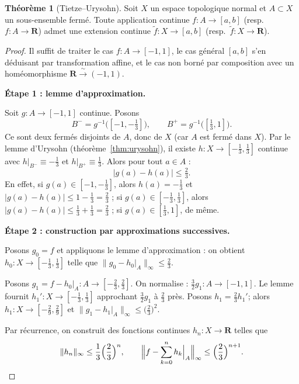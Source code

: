 \documentclass[12pt,a4paper,openany]{book}
\theoremstyle{definition}
\theoremstyle{cours}
\newtheorem{theoreme}{Théorème}[chapter]
\theoremstyle{coursnormal}
\begin{document}
\begin{theoreme}[Tietze--Urysohn]
\label{thm:tietze}
Soit $X$ un espace topologique normal et $A\subset X$ un sous-ensemble
fermé. Toute application continue $f\colon A\to [a,b]$
(resp.\ $f\colon A\to\mathbf{R}$) admet une extension continue
$\tilde{f}\colon X\to [a,b]$ (resp.\ $\tilde{f}\colon X\to\mathbf{R}$).
\end{theoreme}

\begin{proof}
Il suffit de traiter le cas $f\colon A\to[-1,1]$, le cas général
$[a,b]$ s'en déduisant par transformation affine, et le cas non borné
par composition avec un homéomorphisme $\mathbf{R}\xrightarrow{\;\sim\;}(-1,1)$.

\medskip\noindent
\textbf{Étape 1 : lemme d'approximation.}

Soit $g\colon A\to [-1,1]$ continue. Posons
\[
  B^{-}=g^{-1}\!\bigl([-1,-\tfrac{1}{3}]\bigr),\qquad
  B^{+}=g^{-1}\!\bigl([\tfrac{1}{3},1]\bigr).
\]
Ce sont deux fermés disjoints de $A$, donc de $X$ (car $A$ est fermé
dans $X$). Par le lemme d'Urysohn (théorème~\ref{thm:urysohn}),
il existe $h\colon X\to[-\frac{1}{3},\frac{1}{3}]$ continue avec
$h|_{B^{-}}\equiv -\frac{1}{3}$ et $h|_{B^{+}}\equiv \frac{1}{3}$.
Alors pour tout $a\in A$ :
\[
|g(a)-h(a)|\le \tfrac{2}{3}.
\]
En effet, si $g(a)\in[-1,-\frac{1}{3}]$, alors $h(a)=-\frac{1}{3}$
et $|g(a)-h(a)|\le 1-\frac{1}{3}=\frac{2}{3}$ ;
si $g(a)\in[-\frac{1}{3},\frac{1}{3}]$, alors
$|g(a)-h(a)|\le\frac{1}{3}+\frac{1}{3}=\frac{2}{3}$ ;
si $g(a)\in[\frac{1}{3},1]$, de même.

\medskip\noindent
\textbf{Étape 2 : construction par approximations successives.}

Posons $g_0=f$ et appliquons le lemme d'approximation :
on obtient $h_0\colon X\to[-\frac{1}{3},\frac{1}{3}]$ telle que
$\|g_0-h_0|_A\|_\infty\le\frac{2}{3}$.

Posons $g_1=f-h_0|_A\colon A\to [-\frac{2}{3},\frac{2}{3}]$.
On normalise : $\frac{3}{2}g_1\colon A\to[-1,1]$.
Le lemme fournit $h_1'\colon X\to[-\frac{1}{3},\frac{1}{3}]$
approchant $\frac{3}{2}g_1$ à $\frac{2}{3}$ près.
Posons $h_1=\frac{2}{3}h_1'$; alors
$h_1\colon X\to[-\frac{2}{9},\frac{2}{9}]$ et
$\|g_1-h_1|_A\|_\infty\le\bigl(\frac{2}{3}\bigr)^2$.

Par récurrence, on construit des fonctions continues
$h_n\colon X\to\mathbf{R}$ telles que
\[
\|h_n\|_\infty \le \frac{1}{3}\Bigl(\frac{2}{3}\Bigr)^n,
\qquad
\Bigl\|f-\sum_{k=0}^n h_k\Big|_A\Bigr\|_\infty
  \le \Bigl(\frac{2}{3}\Bigr)^{n+1}.
\]


\end{proof}
\end{document}

